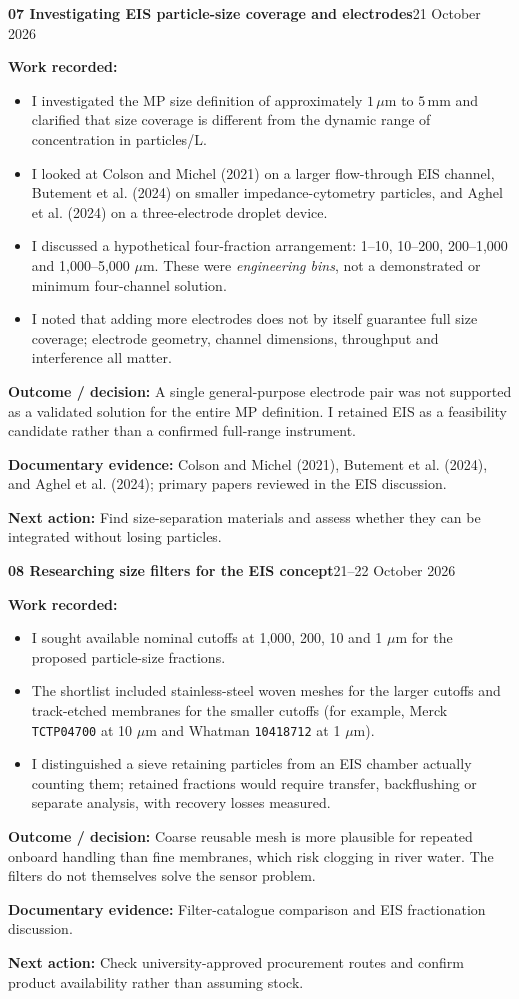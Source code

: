 \documentclass[11pt,a4paper]{article}
\newcommand{\logentry}[3]{%
  \Needspace{13\baselineskip}%
  \vspace{8pt}%
  {\large\bfseries\color{ink}#1 \quad #2}\hfill{\small\color{ink}#3}\par
  \vspace{-3pt}{\color{linecolor}\rule{\linewidth}{.6pt}}\par\vspace{1pt}%
}
\newcommand{\result}[1]{\textbf{Outcome / decision:} #1\par}
\newcommand{\evidence}[1]{\textbf{Documentary evidence:} {\small #1}\par}
\newcommand{\nextstep}[1]{\textbf{Next action:} #1\par}
\begin{document}
\logentry{07}{Investigating EIS particle-size coverage and electrodes}{21 October 2026}
\textbf{Work recorded:}
\begin{itemize}
\item I investigated the MP size definition of approximately $1\,\mu$m to $5\,\mathrm{mm}$ and clarified that size coverage is different from the dynamic range of concentration in particles/L.
\item I looked at Colson and Michel (2021) on a larger flow-through EIS channel, Butement et al. (2024) on smaller impedance-cytometry particles, and Aghel et al. (2024) on a three-electrode droplet device.
\item I discussed a hypothetical four-fraction arrangement: 1--10, 10--200, 200--1,000 and 1,000--5,000 $\mu$m. These were \emph{engineering bins}, not a demonstrated or minimum four-channel solution.
\item I noted that adding more electrodes does not by itself guarantee full size coverage; electrode geometry, channel dimensions, throughput and interference all matter.
\end{itemize}
\result{A single general-purpose electrode pair was not supported as a validated solution for the entire MP definition. I retained EIS as a feasibility candidate rather than a confirmed full-range instrument.}
\evidence{Colson and Michel (2021), Butement et al. (2024), and Aghel et al. (2024); primary papers reviewed in the EIS discussion.}
\nextstep{Find size-separation materials and assess whether they can be integrated without losing particles.}

\logentry{08}{Researching size filters for the EIS concept}{21--22 October 2026}
\textbf{Work recorded:}
\begin{itemize}
\item I sought available nominal cutoffs at 1,000, 200, 10 and 1 $\mu$m for the proposed particle-size fractions.
\item The shortlist included stainless-steel woven meshes for the larger cutoffs and track-etched membranes for the smaller cutoffs (for example, Merck \texttt{TCTP04700} at 10 $\mu$m and Whatman \texttt{10418712} at 1 $\mu$m).
\item I distinguished a sieve retaining particles from an EIS chamber actually counting them; retained fractions would require transfer, backflushing or separate analysis, with recovery losses measured.
\end{itemize}
\result{Coarse reusable mesh is more plausible for repeated onboard handling than fine membranes, which risk clogging in river water. The filters do not themselves solve the sensor problem.}
\evidence{Filter-catalogue comparison and EIS fractionation discussion.}
\nextstep{Check university-approved procurement routes and confirm product availability rather than assuming stock.}
\end{document}
